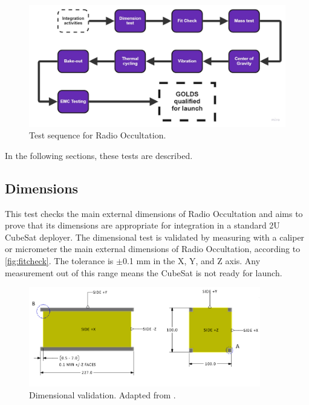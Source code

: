 \begin{figure}[!htb]
    \centering
    \includegraphics[scale=0.3]{figures/tests_chart.pdf}
    \caption{Test sequence for Radio Occultation.}
    \label{fig:testesequency}
\end{figure}

In the following sections, these tests are described.


\subsection{Dimensions}

This test checks the main external dimensions of Radio Occultation and aims to prove that its dimensions are appropriate for integration in a standard 2U CubeSat deployer. The dimensional test is validated by measuring with a caliper or micrometer the main external dimensions of Radio Occultation, according to \autoref{fig:fitcheck}. The tolerance is $\pm$0.1 mm in the X, Y, and Z axis. Any measurement out of this range means the CubeSat is not ready for launch.

\begin{figure}[!htb]
    \begin{center}
        \includegraphics[width=0.9\textwidth]{figures/fit_check.png}
        \caption{Dimensional validation. Adapted from \cite{cds}.}
        \label{fig:fitcheck}
    \end{center}
\end{figure}

